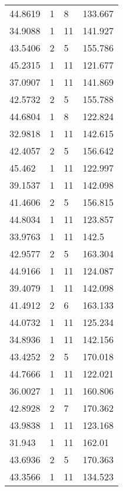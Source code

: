 \documentclass[bwprint]{gmcmthesis}
\begin{document}
\begin{longtable}[c]{llll}
44.8619   & 1           & 8           & 133.667   \\
34.9088   & 1           & 11          & 141.927   \\
43.5406   & 2           & 5           & 155.786   \\
45.2315   & 1           & 11          & 121.677   \\
37.0907   & 1           & 11          & 141.869   \\
42.5732   & 2           & 5           & 155.788   \\
44.6804   & 1           & 8           & 122.824   \\
32.9818   & 1           & 11          & 142.615   \\
42.4057   & 2           & 5           & 156.642   \\
45.462    & 1           & 11          & 122.997   \\
39.1537   & 1           & 11          & 142.098   \\
41.4606   & 2           & 5           & 156.815   \\
44.8034   & 1           & 11          & 123.857   \\
33.9763   & 1           & 11          & 142.5     \\
42.9577   & 2           & 5           & 163.304   \\
44.9166   & 1           & 11          & 124.087   \\
39.4079   & 1           & 11          & 142.098   \\
41.4912   & 2           & 6           & 163.133   \\
44.0732   & 1           & 11          & 125.234   \\
34.8936   & 1           & 11          & 142.156   \\
43.4252   & 2           & 5           & 170.018   \\
44.7666   & 1           & 11          & 122.021   \\
36.0027   & 1           & 11          & 160.806   \\
42.8928   & 2           & 7           & 170.362   \\
43.9838   & 1           & 11          & 123.168   \\
31.943    & 1           & 11          & 162.01    \\
43.6936   & 2           & 5           & 170.363   \\
43.3566   & 1           & 11          & 134.523   \\

\end{longtable}
\end{document}
